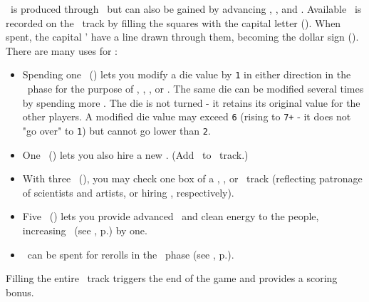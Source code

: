 \currency\ is produced through \factories\ but can also be gained by advancing \trade, \tech, and \culture.  
Available \currency\ is recorded on the \currency\ track by filling the squares with the capital letter (\gaincurrency). 
When spent, the capital \gaincurrency' have a line drawn through them, becoming the dollar sign (\spendcurrency).
There are many uses for \currency:
\begin{itemize}
  \item Spending one \currency\ (\spendcurrency) lets you modify a die value by \texttt{1} in either direction in the \development\ phase for the purpose of \construction, \activation, \trade, or \culture.  The same die can be modified several times by spending more \currency.  The die is not turned - it retains its original value for the other players.  A modified die value may exceed \texttt{6} (rising to \texttt{7+} - it does not "go over" to \texttt{1}) but cannot go lower than \texttt{2}.
  \item One \currency\ (\spendcurrency) lets you also hire a new \astronaut.  (Add \gainastronautsymbol\ to \population\ track.)
  \item With three \currency\ (\spendcurrency\spendcurrency\spendcurrency), you may check one box of a \tech, \culture, or \military\ track (reflecting patronage of scientists and artists, or hiring \pilots, respectively).
  \item Five \currency\ (\spendcurrency\spendcurrency\spendcurrency\spendcurrency\spendcurrency) lets you provide advanced \tech\ and clean energy to the people, increasing \happiness\ (see , p.\pageref{sec:happiness}) by one.
  \item \currency\ can be spent for rerolls in the \diplomacy\ phase (see , p.\pageref{sec:diplomacy}).
\end{itemize}
Filling the entire \currency\ track triggers the end of the game and provides a scoring bonus.
